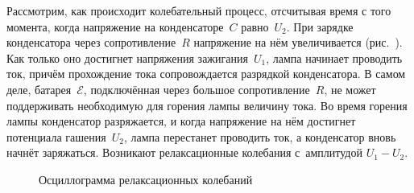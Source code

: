 

Рассмотрим, как происходит колебательный процесс, отсчитывая время с того 
момента, когда напряжение на конденсаторе~$C$ равно~$U_2$. 
При зарядке конденсатора через сопротивление~$R$ напряжение на нём
увеличивается (рис.~).
Как только оно достигнет напряжения зажигания~$U_1$, 
лампа начинает проводить ток, причём прохождение тока сопровождается разрядкой
конденсатора. В самом деле, батарея~$\mathcal{E}$, подключённая через большое
сопротивление~$R$, не может поддерживать необходимую
для горения лампы величину тока. Во время горения лампы конденсатор разряжается,
и когда напряжение на нём достигнет потенциала гашения~$U_2$, 
лампа перестанет проводить ток, а конденсатор вновь начнёт заряжаться. 
Возникают релаксационные колебания с~амплитудой $U_1-U_2$.

\begin{figure}[h!]
    \centering
	\caption{Осциллограмма релаксационных колебаний}
\end{figure}

